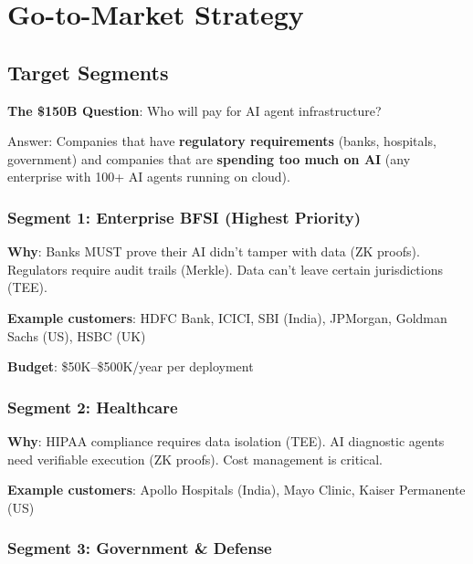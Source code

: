 \documentclass[12pt,a4paper,openany]{report}
\begin{document}
\chapter{Go-to-Market Strategy}

\section{Target Segments}

\begin{moneybox}
\textbf{The \$150B Question}: Who will pay for AI agent infrastructure?

Answer: Companies that have \textbf{regulatory requirements} (banks, hospitals, government) and companies that are \textbf{spending too much on AI} (any enterprise with 100+ AI agents running on cloud).
\end{moneybox}

\subsection{Segment 1: Enterprise BFSI (Highest Priority)}

\textbf{Why}: Banks MUST prove their AI didn't tamper with data (ZK proofs). Regulators require audit trails (Merkle). Data can't leave certain jurisdictions (TEE).

\textbf{Example customers}: HDFC Bank, ICICI, SBI (India), JPMorgan, Goldman Sachs (US), HSBC (UK)

\textbf{Budget}: \$50K--\$500K/year per deployment

\subsection{Segment 2: Healthcare}

\textbf{Why}: HIPAA compliance requires data isolation (TEE). AI diagnostic agents need verifiable execution (ZK proofs). Cost management is critical.

\textbf{Example customers}: Apollo Hospitals (India), Mayo Clinic, Kaiser Permanente (US)

\subsection{Segment 3: Government \& Defense}
\end{document}
